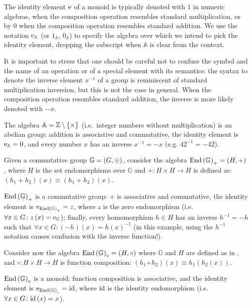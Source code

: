 The identity element \(\mathrm{e} \) of a monoid is typically denoted with \(1\) in 
numeric algebras, when the composition operation resembles standard multiplication, or by \(0\) 
when the composition operation resembles standard addition. 
We use the notation \(\mathrm{e}_{\mathbb{A}}\) (or \(1_{\mathbb{A}}\), 
\(0_{\mathbb{A}}\)) to specify the algebra over which we intend to pick the identity element, 
dropping the subscript when \(\mathbb{A}\) is clear from the context.

It is important to stress that one should be careful not to confuse the symbol and the name of an 
operation or of a special element with its semantics: the syntax to denote the inverse element 
\(x^{-1}\) of a group is reminiscent of standard multiplication inversion, but this is not the 
case in general.
When the composition operation resembles standard addition, the inverse is more likely denoted 
with \(-x\).

\begin{example}
  The algebra \(\mathbb{A} = \mathbb{Z} \setminus \left\{\times\right\}\) (i.e.\ integer numbers 
  without multiplication) is an abelian group: 
  addition is associative and commutative, the identity element is 
  \(\mathrm{e}_{\mathbb{A}} = 0\), and every number \(x\) has an inverse \(x^{-1} = -x\) 
  (e.g. \({42}^{-1} = -42\)). 
\end{example}

\begin{example}\label{ex:endo_group}
  Given a commutative group \(\mathbb{G} = \left(G, \odot\right)\), consider the algebra 
  \(\mathrm{End}\left(\mathbb{G}\right)_{+} = \left(H, +\right)\), where \(H\) is the set endomorphisms over 
  \(\mathbb{G}\) and \(+\colon H \times H \to H\) is defined as: 
  \(\left(h_1 + h_2\right)\left(x\right) \equiv \left(h_1 + h_2\right)\left(x\right)\).

  \(\mathrm{End}\left(\mathbb{G}\right)_{+}\) is a commutative group: \(+\) is associative and 
  commutative, the identity element is \(\mathrm{e}_{\mathrm{End}\left(\mathbb{G}\right)_{+}} = z\), where
  \(z\) is the zero endomorphism (i.e. \(\forall x \in G\colon z\left(x\right) = 
  \mathrm{e}_{\mathbb{G}}\)); finally, every homomorphism \(h \in H\) has an inverse 
  \(h^{-1} = -h\) such that \(\forall x \in G\colon \left(-h\right)\left(x\right) = 
  {h\left(x\right)}^{-1}\) (in this example, using the \(h^{-1}\) notation causes confusion with 
  the inverse function!).
\end{example}

\begin{example}\label{ex:endo_monoid}
  Consider now the algebra \(\mathrm{End}\left(\mathbb{G}\right)_{\circ} = \left(H, \circ\right)\) 
  where \(\mathbb{G}\) and \(H\) are defined as in , and 
  \(\circ\colon H \times H \to H\) is function composition: 
  \(\left(h_1 \circ h_2\right)\left(x\right) \equiv h_1\left(h_2\left(x\right)\right)\).
  
  \(\mathrm{End}\left(\mathbb{G}\right)_{\circ}\) is a monoid: function composition is associative, and the 
  identity element is \(\mathrm{e}_{\mathrm{End}\left(\mathbb{G}\right)_{\circ}} = \mathrm{id} \), where \(\mathrm{id} \) is the
  identity endomorphism (i.e. \(\forall x \in G\colon \mathrm{id}\left(x\right) = x\)). 
\end{example}

